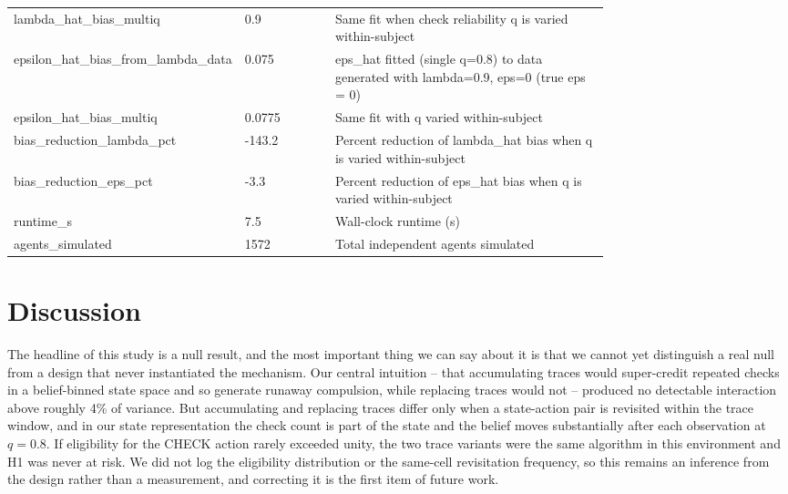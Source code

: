 \documentclass[11pt,a4paper]{article}
\begin{document}
\begin{table}[ht]
\begin{tabular}{p{0.3\linewidth} l p{0.46\linewidth}}
lambda\_\allowbreak{}hat\_\allowbreak{}bias\_\allowbreak{}multiq & 0.9 & Same fit when check reliability q is varied within-subject\\
epsilon\_\allowbreak{}hat\_\allowbreak{}bias\_\allowbreak{}from\_\allowbreak{}lambda\_\allowbreak{}data & 0.075 & eps\_hat fitted (single q=0.8) to data generated with lambda=0.9, eps=0 (true eps = 0)\\
epsilon\_\allowbreak{}hat\_\allowbreak{}bias\_\allowbreak{}multiq & 0.0775 & Same fit with q varied within-subject\\
bias\_\allowbreak{}reduction\_\allowbreak{}lambda\_\allowbreak{}pct & -143.2 & Percent reduction of lambda\_hat bias when q is varied within-subject\\
bias\_\allowbreak{}reduction\_\allowbreak{}eps\_\allowbreak{}pct & -3.3 & Percent reduction of eps\_hat bias when q is varied within-subject\\
runtime\_\allowbreak{}s & 7.5 & Wall-clock runtime (s)\\
agents\_\allowbreak{}simulated & 1572 & Total independent agents simulated\\
\bottomrule
\end{tabular}
\end{table}
\section{Discussion}
The headline of this study is a null result, and the most important thing we can say about it is that we cannot yet distinguish a real null from a design that never instantiated the mechanism. Our central intuition -- that accumulating traces would super-credit repeated checks in a belief-binned state space and so generate runaway compulsion, while replacing traces would not \citep{singh1996reinforcement} -- produced no detectable interaction above roughly 4\% of variance. But accumulating and replacing traces differ only when a state-action pair is revisited within the trace window, and in our state representation the check count is part of the state and the belief moves substantially after each observation at $q=0.8$. If eligibility for the CHECK action rarely exceeded unity, the two trace variants were the same algorithm in this environment and H1 was never at risk. We did not log the eligibility distribution or the same-cell revisitation frequency, so this remains an inference from the design rather than a measurement, and correcting it is the first item of future work.
\end{document}
